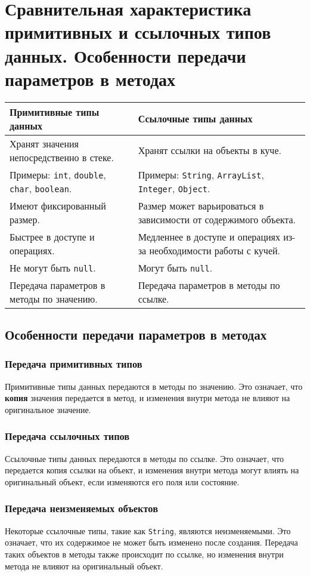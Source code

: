 \documentclass[12pt, a4paper]{article}
\begin{document}
\section{Сравнительная характеристика примитивных и ссылочных типов данных. Особенности передачи параметров в методах}
\begin{tabular}{|p{6cm}|p{6cm}|}
\hline
\textbf{Примитивные типы данных} & \textbf{Ссылочные типы данных} \\
\hline
Хранят значения непосредственно в стеке. & Хранят ссылки на объекты в куче. \\
\hline
Примеры: \texttt{int}, \texttt{double}, \texttt{char}, \texttt{boolean}. & Примеры: \texttt{String}, \texttt{ArrayList}, \texttt{Integer}, \texttt{Object}. \\
\hline
Имеют фиксированный размер. & Размер может варьироваться в зависимости от содержимого объекта. \\
\hline
Быстрее в доступе и операциях. & Медленнее в доступе и операциях из-за необходимости работы с кучей. \\
\hline
Не могут быть \texttt{null}. & Могут быть \texttt{null}. \\
\hline
Передача параметров в методы по значению. & Передача параметров в методы по ссылке. \\
\hline
\end{tabular}

\subsection*{Особенности передачи параметров в методах}

\subsubsection*{Передача примитивных типов}
Примитивные типы данных передаются в методы по значению. Это означает, что \textbf{копия} значения передается в метод, и изменения внутри метода не влияют на оригинальное значение.

\subsubsection*{Передача ссылочных типов}
Ссылочные типы данных передаются в методы по ссылке. Это означает, что передается копия ссылки на объект, и изменения внутри метода могут влиять на оригинальный объект, если изменяются его поля или состояние.

\subsubsection*{Передача неизменяемых объектов}
Некоторые ссылочные типы, такие как \texttt{String}, являются неизменяемыми. Это означает, что их содержимое не может быть изменено после создания. Передача таких объектов в методы также происходит по ссылке, но изменения внутри метода не влияют на оригинальный объект.
\end{document}
